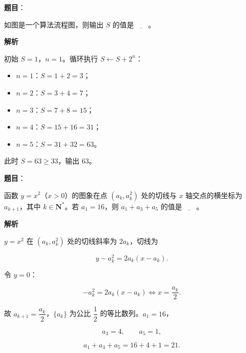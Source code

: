 \begin{answer}

\textbf{题目}：

如图是一个算法流程图，则输出 $S$ 的值是$\underline{\qquad}$。
\nopagebreak[4]
\begin{center}\end{center}
\nopagebreak[4]
\textbf{解析}

初始 $S=1$，$n=1$。循环执行 $S\leftarrow S+2^n$：

\begin{itemize}
\item $n=1$：$S=1+2=3$；
\item $n=2$：$S=3+4=7$；
\item $n=3$：$S=7+8=15$；
\item $n=4$：$S=15+16=31$；
\item $n=5$：$S=31+32=63$。
\end{itemize}

此时 $S=63\geqslant33$，输出 $63$。


\end{answer}
\begin{answer}

\textbf{题目}：

函数 $y=x^2$（$x>0$）的图象在点 $(a_k,a_k^2)$ 处的切线与 $x$ 轴交点的横坐标为 $a_{k+1}$，其中 $k\in\mathbf N^*$。若 $a_1=16$，则 $a_1+a_3+a_5$ 的值是$\underline{\qquad}$。

\textbf{解析}

$y=x^2$ 在 $(a_k,a_k^2)$ 处的切线斜率为 $2a_k$，切线为

\nopagebreak[4]
\[y-a_k^2=2a_k(x-a_k).\]

令 $y=0$：

\nopagebreak[4]
\[-a_k^2=2a_k(x-a_k)\iff x=\frac{a_k}2.\]

故 $a_{k+1}=\dfrac{a_k}2$，$\{a_k\}$ 为公比 $\dfrac12$ 的等比数列。$a_1=16$，

\nopagebreak[4]
\[a_3=4,\qquad a_5=1,\]

\nopagebreak[4]
\[a_1+a_3+a_5=16+4+1=21.\]


\end{answer}
